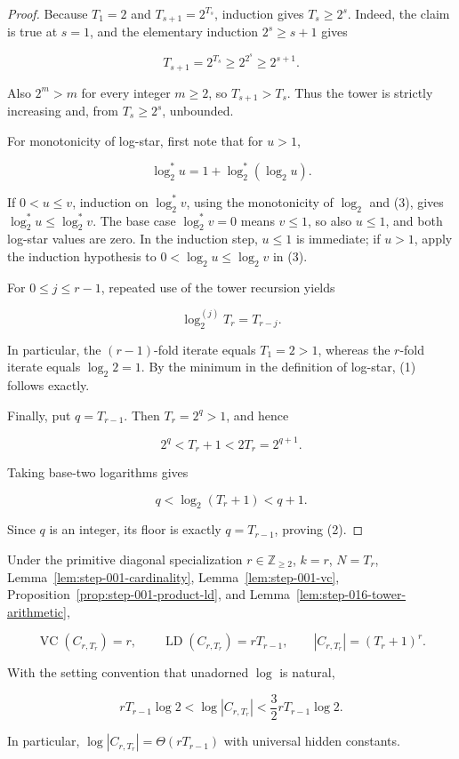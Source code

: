 \begin{proof}
Because \(T_1=2\) and \(T_{s+1}=2^{T_s}\), induction gives
\(T_s\ge2^s\). Indeed, the claim is true at \(s=1\), and the elementary
induction \(2^s\ge s+1\) gives

\[
T_{s+1}=2^{T_s}\ge2^{2^s}\ge2^{s+1}.
\]

Also \(2^m>m\) for every integer \(m\ge2\), so
\(T_{s+1}>T_s\). Thus the tower is strictly increasing and, from
\(T_s\ge2^s\), unbounded.

For monotonicity of log-star, first note that for \(u>1\),

\[
\log_2^*u=1+\log_2^*(\log_2u).
\tag{3}
\]

If \(0<u\le v\), induction on \(\log_2^*v\), using the monotonicity of
\(\log_2\) and (3), gives \(\log_2^*u\le\log_2^*v\). The base case
\(\log_2^*v=0\) means \(v\le1\), so also \(u\le1\), and both log-star
values are zero. In the induction step, \(u\le1\) is immediate; if
\(u>1\), apply the induction hypothesis to
\(0<\log_2u\le\log_2v\) in (3).

For \(0\le j\le r-1\), repeated use of the tower recursion yields

\[
\log_2^{(j)}T_r=T_{r-j}.
\tag{4}
\]

In particular, the \((r-1)\)-fold iterate equals \(T_1=2>1\), whereas
the \(r\)-fold iterate equals \(\log_2 2=1\). By the minimum in the
definition of log-star, (1) follows exactly.

Finally, put \(q=T_{r-1}\). Then \(T_r=2^q>1\), and hence

\[
2^q<T_r+1<2T_r=2^{q+1}.
\]

Taking base-two logarithms gives

\[
q<\log_2(T_r+1)<q+1.
\]

Since \(q\) is an integer, its floor is exactly \(q=T_{r-1}\), proving
(2). \end{proof}

\begin{proposition}\label{prop:step-016-structural-diagonal}
Under the primitive diagonal specialization \(r\in\mathbb Z_{\ge2}\),
\(k=r\), \(N=T_r\), Lemma~\ref{lem:step-001-cardinality}, Lemma~\ref{lem:step-001-vc}, Proposition~\ref{prop:step-001-product-ld}, and
Lemma~\ref{lem:step-016-tower-arithmetic},

\[
\operatorname{VC}(C_{r,T_r})=r,
\qquad
\operatorname{LD}(C_{r,T_r})=rT_{r-1},
\qquad
|C_{r,T_r}|=(T_r+1)^r.
\tag{5}
\]

With the setting convention that unadorned \(\log\) is natural,

\[
rT_{r-1}\log2
  <\log|C_{r,T_r}|
  <\frac32rT_{r-1}\log2.
\tag{6}
\]

In particular,
\(\log|C_{r,T_r}|=\Theta(rT_{r-1})\) with universal hidden constants.
\end{proposition}


